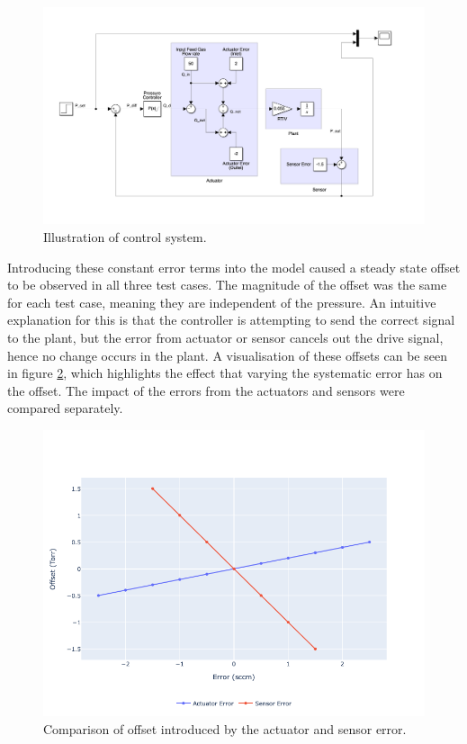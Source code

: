 \begin{figure}[h!]
	\centering
	\includegraphics[width=\linewidth]{chapter_5/figures/pi_controller.png}
	\caption{Illustration of control system.}
	\label{fig:pi_controller}
\end{figure}

Introducing these constant error terms into the model caused a steady state offset to be observed in all three test cases. The magnitude of the offset was the same for each test case, meaning they are independent of the pressure. An intuitive explanation for this is that the controller is attempting to send the correct signal to the plant, but the error from actuator or sensor cancels out the drive signal, hence no change occurs in the plant. A visualisation of these offsets can be seen in figure \ref{fig:sensor_actuator_error}, which highlights the effect that varying the systematic error has on the offset. The impact of the errors from the actuators and sensors were compared separately.

\begin{figure}[h!]
	\centering
	\includegraphics[width=\linewidth]{chapter_5/figures/sensor_actuator_error.png}
	\caption{Comparison of offset introduced by the actuator and sensor error.}
	\label{fig:sensor_actuator_error}
\end{figure}

